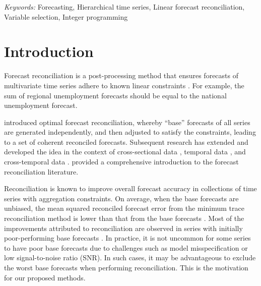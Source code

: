 \documentclass[
  11pt]{article}
\theoremstyle{plain}
\theoremstyle{remark}
\begin{document}
\noindent%
{\it Keywords:} Forecasting, Hierarchical time series, Linear forecast
reconciliation, Variable selection, Integer programming
\vfill

\newpage
\section{Introduction}\label{sec-introduction}

Forecast reconciliation is a post-processing method that ensures
forecasts of multivariate time series adhere to known linear constraints
\citep{Hyndman2011-sd}. For example, the sum of regional unemployment
forecasts should be equal to the national unemployment forecast.

\citet{Hyndman2011-sd} introduced optimal forecast reconciliation,
whereby ``base'' forecasts of all series are generated independently,
and then adjusted to satisfy the constraints, leading to a set of
coherent reconciled forecasts. Subsequent research has extended and
developed the idea in the context of cross-sectional data
\citep{Hyndman2016-cz, Wickramasuriya2019-fc, Panagiotelis2021-mf},
temporal data \citep{Athanasopoulos2017-jj}, and cross-temporal data
\citep{Di_Fonzo2023-vo}. \citet{Athanasopoulos2024-sm} provided a
comprehensive introduction to the forecast reconciliation literature.

Reconciliation is known to improve overall forecast accuracy in
collections of time series with aggregation constraints. On average,
when the base forecasts are unbiased, the mean squared reconciled
forecast error from the minimum trace reconciliation method
\citep{Wickramasuriya2019-fc} is lower than that from the base forecasts
\citep{Wickramasuriya2021-am}. Most of the improvements attributed to
reconciliation are observed in series with initially poor-performing
base forecasts \citep{Athanasopoulos2017-jj}. In practice, it is not
uncommon for some series to have poor base forecasts due to challenges
such as model misspecification or low signal-to-noise ratio (SNR). In
such cases, it may be advantageous to exclude the worst base forecasts
when performing reconciliation. This is the motivation for our proposed
methods.
\end{document}
